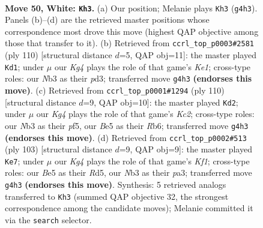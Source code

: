 \documentclass[11pt]{article}
\begin{document}
\clearpage

\begin{figure}[p]\centering
\begin{subfigure}{0.46\textwidth}\centering
\resizebox{\linewidth}{!}{%
\newchessgame
\chessboard[
  setfen={5k2/2P5/2r5/4B3/6K1/1N6/8/8 w - - 13 50},
  showmover=false,
  pgfstyle=straightmove, color=movearrow, markmove={g4-h3}
]}
\caption{}
\end{subfigure}\hfill
\begin{subfigure}{0.46\textwidth}\centering
\resizebox{\linewidth}{!}{%
\newchessgame
\chessboard[
  setfen={3B4/8/8/5k2/7P/3p4/7r/4K3 w - - 3 56},
  showmover=false,
  pgfstyle=straightmove, color=movearrow, markmove={e1-d1}
]}
\caption{}
\end{subfigure}
\\[4pt]
\begin{subfigure}{0.46\textwidth}\centering
\resizebox{\linewidth}{!}{%
\newchessgame
\chessboard[
  setfen={8/5k2/PR6/5p2/8/r7/2K5/8 w - - 9 56},
  showmover=false,
  pgfstyle=straightmove, color=movearrow, markmove={c2-d2}
]}
\caption{}
\end{subfigure}\hfill
\begin{subfigure}{0.46\textwidth}\centering
\resizebox{\linewidth}{!}{%
\newchessgame
\chessboard[
  setfen={5k2/8/8/3rp3/8/P5K1/4R3/8 b - - 1 52},
  showmover=false,
  pgfstyle=straightmove, color=movearrow, markmove={f8-e7}
]}
\caption{}
\end{subfigure}
\caption{\textbf{Move 50, White: \texttt{Kh3}.} (a) Our position; Melanie plays \texttt{Kh3} (\texttt{g4h3}). Panels (b)--(d) are the retrieved master positions whose correspondence most drove this move (highest QAP objective among those that transfer to it). (b) Retrieved from \texttt{ccrl\_top\_p0003\#2581} (ply 110) [structural distance $d$=5, QAP obj=11]: the master played \texttt{Kd1}; under $\mu$ our \emph{Kg4} plays the role of that game's \emph{Ke1}; cross-type roles: our \emph{N}b3 as their \emph{p}d3; transferred move \texttt{g4h3} \textbf{(endorses this move)}. (c) Retrieved from \texttt{ccrl\_top\_p0001\#1294} (ply 110) [structural distance $d$=9, QAP obj=10]: the master played \texttt{Kd2}; under $\mu$ our \emph{Kg4} plays the role of that game's \emph{Kc2}; cross-type roles: our \emph{N}b3 as their \emph{p}f5, our \emph{B}e5 as their \emph{R}b6; transferred move \texttt{g4h3} \textbf{(endorses this move)}. (d) Retrieved from \texttt{ccrl\_top\_p0002\#513} (ply 103) [structural distance $d$=9, QAP obj=9]: the master played \texttt{Ke7}; under $\mu$ our \emph{Kg4} plays the role of that game's \emph{Kf1}; cross-type roles: our \emph{B}e5 as their \emph{R}d5, our \emph{N}b3 as their \emph{p}a3; transferred move \texttt{g4h3} \textbf{(endorses this move)}. Synthesis: 5 retrieved analogs transferred to \texttt{Kh3} (summed QAP objective 32, the strongest correspondence among the candidate moves); Melanie committed it via the \texttt{search} selector.}
\label{fig:thought-m98}
\end{figure}
\end{document}
